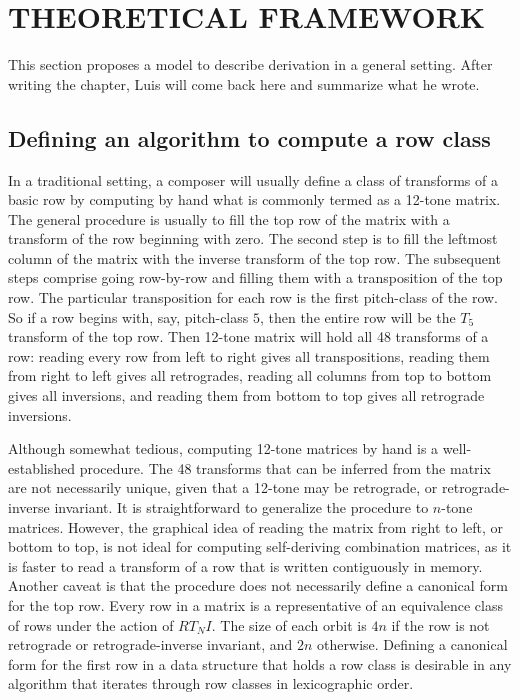 \chapter{THEORETICAL FRAMEWORK}

This section proposes a model to describe derivation in a general setting. After writing the chapter, Luis will come back here and summarize what he wrote.

\section{Defining an algorithm to compute a row class}

In a traditional setting, a composer will usually define a class of transforms of a basic row by computing by hand what is commonly termed as a 12-tone matrix. The general procedure is usually to fill the top row of the matrix with a transform of the row beginning with zero. The second step is to fill the leftmost column of the matrix with the inverse transform of the top row. The subsequent steps comprise going row-by-row and filling them with a transposition of the top row. The particular transposition for each row is the first pitch-class of the row. So if a row begins with, say, pitch-class $5$, then the entire row will be the $T_5$ transform of the top row. Then 12-tone matrix will hold all 48 transforms of a row: reading every row from left to right gives all transpositions, reading them from right to left gives all retrogrades, reading all columns from top to bottom gives all inversions, and reading them from bottom to top gives all retrograde inversions.

Although somewhat tedious, computing 12-tone matrices by hand is a well-established procedure. The 48 transforms that can be inferred from the matrix are not necessarily unique, given that a 12-tone may be retrograde, or retrograde-inverse invariant. It is straightforward to generalize the procedure to $n$-tone matrices. However, the graphical idea of reading the matrix from right to left, or bottom to top, is not ideal for computing self-deriving combination matrices, as it is faster to read a transform of a row that is written contiguously in memory. Another caveat is that the procedure does not necessarily define a canonical form for the top row. Every row in a matrix is a representative of an equivalence class of rows under the action of $RT_NI$. The size of each orbit is $4n$ if the row is not retrograde or retrograde-inverse invariant, and $2n$ otherwise. Defining a canonical form for the first row in a data structure that holds a row class is desirable in any algorithm that iterates through row classes in lexicographic order.

